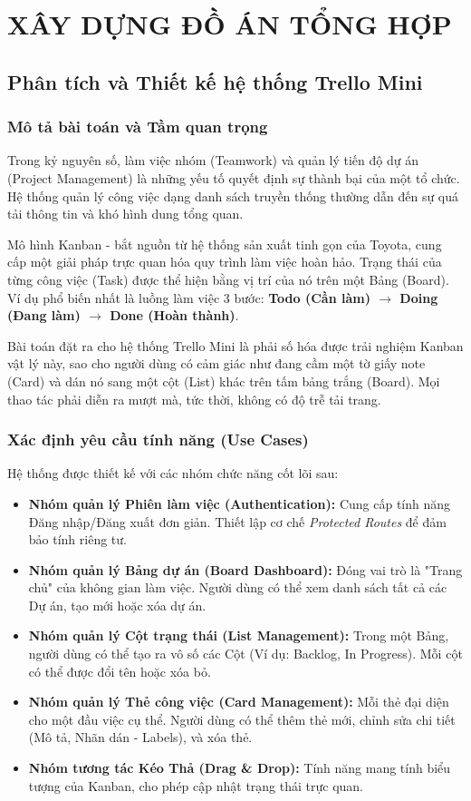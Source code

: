 \part{XÂY DỰNG ĐỒ ÁN TỔNG HỢP}

\chapter{Phân tích và Thiết kế hệ thống Trello Mini}

\section{Mô tả bài toán và Tầm quan trọng}
Trong kỷ nguyên số, làm việc nhóm (Teamwork) và quản lý tiến độ dự án (Project Management) là những yếu tố quyết định sự thành bại của một tổ chức. Hệ thống quản lý công việc dạng danh sách truyền thống thường dẫn đến sự quá tải thông tin và khó hình dung tổng quan.

Mô hình Kanban - bắt nguồn từ hệ thống sản xuất tinh gọn của Toyota, cung cấp một giải pháp trực quan hóa quy trình làm việc hoàn hảo. Trạng thái của từng công việc (Task) được thể hiện bằng vị trí của nó trên một Bảng (Board). Ví dụ phổ biến nhất là luồng làm việc 3 bước: \textbf{Todo (Cần làm) $\rightarrow$ Doing (Đang làm) $\rightarrow$ Done (Hoàn thành)}.

Bài toán đặt ra cho hệ thống Trello Mini là phải số hóa được trải nghiệm Kanban vật lý này, sao cho người dùng có cảm giác như đang cầm một tờ giấy note (Card) và dán nó sang một cột (List) khác trên tấm bảng trắng (Board). Mọi thao tác phải diễn ra mượt mà, tức thời, không có độ trễ tải trang.

\section{Xác định yêu cầu tính năng (Use Cases)}
Hệ thống được thiết kế với các nhóm chức năng cốt lõi sau:
\begin{itemize}
    \item \textbf{Nhóm quản lý Phiên làm việc (Authentication):} Cung cấp tính năng Đăng nhập/Đăng xuất đơn giản. Thiết lập cơ chế \textit{Protected Routes} để đảm bảo tính riêng tư.
    \item \textbf{Nhóm quản lý Bảng dự án (Board Dashboard):} Đóng vai trò là "Trang chủ" của không gian làm việc. Người dùng có thể xem danh sách tất cả các Dự án, tạo mới hoặc xóa dự án.
    \item \textbf{Nhóm quản lý Cột trạng thái (List Management):} Trong một Bảng, người dùng có thể tạo ra vô số các Cột (Ví dụ: Backlog, In Progress). Mỗi cột có thể được đổi tên hoặc xóa bỏ.
    \item \textbf{Nhóm quản lý Thẻ công việc (Card Management):} Mỗi thẻ đại diện cho một đầu việc cụ thể. Người dùng có thể thêm thẻ mới, chỉnh sửa chi tiết (Mô tả, Nhãn dán - Labels), và xóa thẻ.
    \item \textbf{Nhóm tương tác Kéo Thả (Drag \& Drop):} Tính năng mang tính biểu tượng của Kanban, cho phép cập nhật trạng thái trực quan.
\end{itemize}


